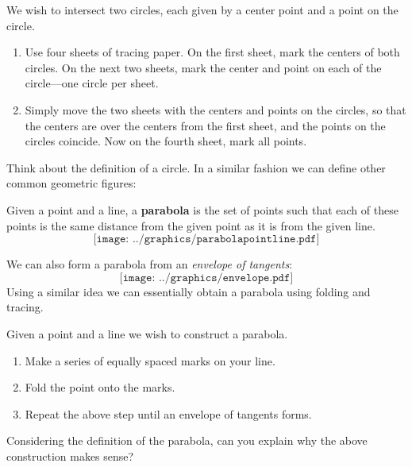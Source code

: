 \begin{construction} 
We wish to intersect two circles, each given by a center point and a
point on the circle. 
\begin{enumerate}
\item Use four sheets of tracing paper. On the first sheet, mark the
  centers of both circles. On the next two sheets, mark the center and
  point on each of the circle---one circle per sheet. 
\item Simply move the two sheets with the centers and points on the
  circles, so that the centers are over the centers from the first
  sheet, and the points on the circles coincide. Now on the fourth
  sheet, mark all points.
\end{enumerate}
\end{construction}
\QM


Think about the definition of a circle. In a similar fashion we can
define other common geometric figures:


\begin{definition} 
Given a point and a line, a \textbf{parabola} is the
set of points such that each of these points is the same distance from
the given point as it is from the given line.
\[
\texttt{[image: ../graphics/parabolapointline.pdf]}
\]
\end{definition}

We can also form a parabola from an \textit{envelope of
  tangents}:
\[
\texttt{[image: ../graphics/envelope.pdf]}
\]
Using a similar idea we can essentially obtain a parabola using
folding and tracing.

\begin{construction}[Parabola] 
Given a point and a line we wish to construct a parabola.
\begin{enumerate}
\item Make a series of equally spaced marks on your line. 
\item Fold the point onto the marks.
\item Repeat the above step until an envelope of tangents forms.
\end{enumerate}
\end{construction}

\begin{question} 
Considering the definition of the parabola, can you explain why the
above construction makes sense?
\end{question}
\QM

